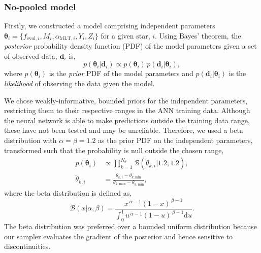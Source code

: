 \documentclass[a4paper,fleqn,usenatbib]{mnras}
\begin{document}
\subsubsection{No-pooled model}\label{sec:np}

Firstly, we constructed a model comprising independent parameters $\boldsymbol{\theta}_i = \{f_{\mathrm{evol}, i}, M_i, \alpha_{\mathrm{MLT},i}, Y_i, Z_i\}$ for a given star, $i$. Using Bayes' theorem, the \emph{posterior} probability density function (PDF) of the model parameters given a set of observed data, $\boldsymbol{d}_i$ is,
%
\begin{equation}
    p(\boldsymbol{\theta}_i | \boldsymbol{d}_i) \propto p(\boldsymbol{\theta}_i) \, p(\boldsymbol{d}_i | \boldsymbol{\theta}_i),
    \label{eq:bayes}
\end{equation}
%
where $p(\boldsymbol{\theta}_i)$ is the \emph{prior} PDF of the model parameters and $p(\boldsymbol{d}_i | \boldsymbol{\theta}_i)$ is the \emph{likelihood} of observing the data given the model.

We chose weakly-informative, bounded priors for the independent parameters, restricting them to their respective ranges in the ANN training data. Although the neural network is able to make predictions outside the training data range, these have not been tested and may be unreliable. Therefore, we used a beta distribution with $\alpha = \beta = 1.2$ as the prior PDF on the independent parameters, transformed such that the probability is null outside the chosen range,
%
\begin{align}
    p(\boldsymbol{\theta}_i) &\propto \prod_{k=1}^{N_{\theta}} \mathcal{B}\left(\tilde{\theta}_{k, i} | 1.2, 1.2\right),\\
    \tilde{\theta}_{k, i} &= \frac{\theta_{k, i} - \theta_{k, \mathrm{min}}}{\theta_{k, \mathrm{max}} - \theta_{k, \mathrm{min}}},
\end{align}
%
where the beta distribution is defined as,
%
\begin{equation}
    \mathcal{B}(x | \alpha, \beta) = \frac{x^{\,\alpha-1}(1-x)^{\,\beta-1}}{\int_{0}^{1} u^{\,\alpha-1}(1-u)^{\,\beta-1} \mathrm{d} u}.
\end{equation}
%
The beta distribution was preferred over a bounded uniform distribution because our sampler evaluates the gradient of the posterior and hence sensitive to discontinuities. 
\end{document}
